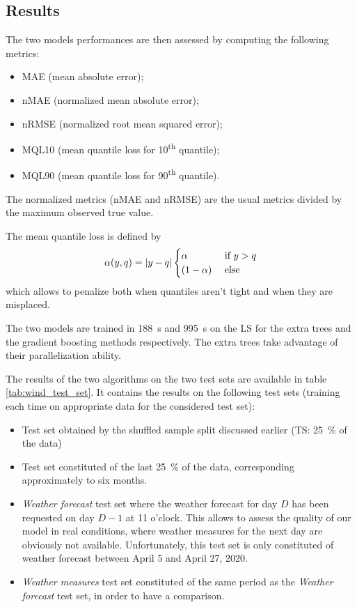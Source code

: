 \documentclass[a4paper, 12pt]{article}
\begin{document}
\subsection{Results}

	The two models performances are then assessed by computing the following metrics:
	\begin{itemize}
		\item MAE (mean absolute error);
		\item nMAE (normalized mean absolute error);
		\item nRMSE (normalized root mean squared error);
		\item MQL10 (mean quantile loss for \num{10}\textsuperscript{th} quantile);
		\item MQL90 (mean quantile loss for \num{90}\textsuperscript{th} quantile).
	\end{itemize}
	The normalized metrics (nMAE and nRMSE) are the usual metrics divided by the maximum observed true value.

	The mean quantile loss is defined by
	\begin{equation*}
		\alpha(y, q) = \left|y - q\right| \begin{cases}
			\alpha & \text{ if } y > q \\
			(1 - \alpha) & \text{ else }
		\end{cases}
	\end{equation*}
	which allows to penalize both when quantiles aren't tight and when they are misplaced.

	The two models are trained in \SI{188}{\second} and \SI{995}{\second} on the LS for the extra trees and the gradient boosting methods respectively\footnotemark[\value{footnote}]. The extra trees take advantage of their parallelization ability.
	

	The results of the two algorithms on the two test sets are available in table \ref{tab:wind_test_set}. It contains the results on the following test sets (training each time on appropriate data for the considered test set):
	\begin{itemize}
		\item Test set obtained by the shuffled sample split discussed earlier (TS: \SI{25}{\percent} of the data)
		\item Test set constituted of the last \SI{25}{\percent} of the data, corresponding approximately to six months.
		\item \emph{Weather forecast} test set where the weather forecast for day $D$ has been requested on day $D - 1$ at 11 o'clock. This allows to assess the quality of our model in real conditions, where weather measures for the next day are obviously not available. Unfortunately, this test set is only constituted of weather forecast between April 5 and April 27, 2020.
		\item \emph{Weather measures} test set constituted of the same period as the \emph{Weather forecast} test set, in order to have a comparison.
	\end{itemize}
\end{document}
